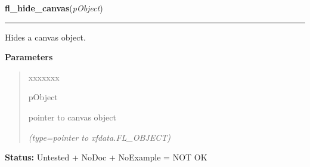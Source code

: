 \hspace{.8\funcindent}\begin{boxedminipage}{\funcwidth}

    \raggedright \textbf{fl\_hide\_canvas}(\textit{pObject})

    \vspace{-1.5ex}

    \rule{\textwidth}{0.5\fboxrule}
\setlength{\parskip}{2ex}
    Hides a canvas object.

\setlength{\parskip}{1ex}
      \textbf{Parameters}
      \vspace{-1ex}

      \begin{quote}
        \begin{Ventry}{xxxxxxx}

          \item[pObject]

          pointer to canvas object

            {\it (type=pointer to xfdata.FL\_OBJECT)}

        \end{Ventry}

      \end{quote}

\textbf{Status:} Untested + NoDoc + NoExample = NOT OK



    \end{boxedminipage}

    \label{xformslib:library:fl_share_canvas_colormap}

    \vspace{0.5ex}

